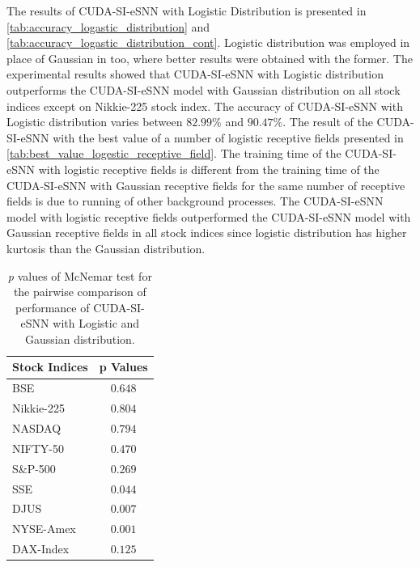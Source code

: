 
The results of CUDA-SI-eSNN with Logistic Distribution is presented in \tablenames \ref{tab:accuracy_logastic_distribution} and \ref{tab:accuracy_logastic_distribution_cont}. Logistic distribution was employed in place of Gaussian in \citep{farquad2012analytical} too, where better results were obtained with the former. The experimental results showed that CUDA-SI-eSNN with Logistic distribution outperforms the CUDA-SI-eSNN model with Gaussian distribution on all stock indices except on Nikkie-225 stock index. The accuracy of CUDA-SI-eSNN with Logistic distribution varies between $82.99\%$ and $90.47\%$. The result of the CUDA-SI-eSNN with the best value of a number of logistic receptive fields presented in \tablename \ref{tab:best_value_logestic_receptive_field}. The training time of the CUDA-SI-eSNN with logistic receptive fields is different from the training time of the CUDA-SI-eSNN with Gaussian receptive fields for the same number of receptive fields is due to running of other background processes. The CUDA-SI-eSNN model with logistic receptive fields outperformed the CUDA-SI-eSNN model with Gaussian receptive fields in all stock indices since logistic distribution has higher kurtosis than the Gaussian distribution.

\begin{table}
	\centering
	\caption {\textit{p} values of McNemar test for the pairwise comparison of performance of CUDA-SI-eSNN with Logistic and Gaussian distribution.}
	\label{tab:p_values}
	\begin{tabular}{@{}lc@{}}
		\toprule[1.25pt]
		Stock Indices & p Values \\ \midrule
		BSE           & $0.648$    \\
		Nikkie-225    & $0.804$   \\
		NASDAQ        & $0.794$    \\
		NIFTY-50      & $0.470$   \\
		S\&P-500      & $0.269$   \\
		SSE           & $0.044$   \\
		DJUS          & $0.007$   \\
		NYSE-Amex     & $0.001$   \\
		DAX-Index     & $0.125$   \\ \bottomrule[1.25pt]
	\end{tabular}
\end{table}

